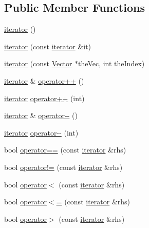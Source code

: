 \subsection*{Public Member Functions}
\begin{DoxyCompactItemize}
\item 
\mbox{\hyperlink{classVector_1_1iterator_abb2ef461955fb8ac9832266262824615}{iterator}} ()
\item 
\mbox{\hyperlink{classVector_1_1iterator_a7711538af29058546d3772cc4d247587}{iterator}} (const \mbox{\hyperlink{classVector_1_1iterator}{iterator}} \&it)
\item 
\mbox{\hyperlink{classVector_1_1iterator_a1c3f63db0aca53bc7f8f60f614a992b2}{iterator}} (const \mbox{\hyperlink{classVector}{Vector}} $\ast$the\+Vec, int the\+Index)
\item 
\mbox{\hyperlink{classVector_1_1iterator}{iterator}} \& \mbox{\hyperlink{classVector_1_1iterator_aee1af72fa48042a12cdecdef98cb872c}{operator++}} ()
\item 
\mbox{\hyperlink{classVector_1_1iterator}{iterator}} \mbox{\hyperlink{classVector_1_1iterator_a436b3205d0992af68d6894d2b0fc5554}{operator++}} (int)
\item 
\mbox{\hyperlink{classVector_1_1iterator}{iterator}} \& \mbox{\hyperlink{classVector_1_1iterator_abd9e59936896a8f122e1447ca83e5783}{operator-\/-\/}} ()
\item 
\mbox{\hyperlink{classVector_1_1iterator}{iterator}} \mbox{\hyperlink{classVector_1_1iterator_a1ed0f955f13b3f41e07a868d3cb8f9fe}{operator-\/-\/}} (int)
\item 
bool \mbox{\hyperlink{classVector_1_1iterator_a67bb3347e32785eeae9226d6ffd81281}{operator==}} (const \mbox{\hyperlink{classVector_1_1iterator}{iterator}} \&rhs)
\item 
bool \mbox{\hyperlink{classVector_1_1iterator_a1e7af33b9a9c2d4c9e4ec5ef35603299}{operator!=}} (const \mbox{\hyperlink{classVector_1_1iterator}{iterator}} \&rhs)
\item 
bool \mbox{\hyperlink{classVector_1_1iterator_a279a96f81826b964bf9ac40e7ddfdf49}{operator$<$}} (const \mbox{\hyperlink{classVector_1_1iterator}{iterator}} \&rhs)
\item 
bool \mbox{\hyperlink{classVector_1_1iterator_ad8383e8041e8c1f3e62d46475cdab6a7}{operator$<$=}} (const \mbox{\hyperlink{classVector_1_1iterator}{iterator}} \&rhs)
\item 
bool \mbox{\hyperlink{classVector_1_1iterator_a3f2c9b91d423fe7c80e7a130b365342f}{operator$>$}} (const \mbox{\hyperlink{classVector_1_1iterator}{iterator}} \&rhs)

\end{DoxyCompactItemize}
